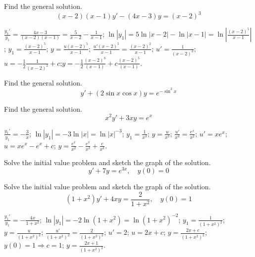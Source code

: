 \documentclass{ximera}
\begin{document}
\begin{problem}\label{exer:2.1.22} Find the general solution.
$$(x-2)(x-1)y'-(4x-3)y=(x-2)^3$$



\begin{solution}
    $\frac{y_1'}{ y_1}=\frac{4x-3}{(x-2)(x-1)}=\frac{5}{
x-2}-\frac{1}{ x-1}$;\quad
$\ln|y_1|=5\ln|x-2|-\ln|x-1|=\ln\left|\frac{(x-2)^5}{
x-1}\right|$;\quad
$y_1=\frac{(x-2)^5}{ x-1}$;\quad
 $y=\frac{u(x-2)^5}{ x-1}$;\quad
$\frac{u'(x-2)^5}{ x-1}=\frac{(x-2)^2}{ x-1}$;\quad
$u'=\frac{1}{ (x-2)^3}$;\quad
$u=-\frac{1}{ 2}\frac{1}{(x-2)^2} +c$;\quad $y=-\frac{1}{
2}\frac{(x-2)^3}{ (x-1)}+c\frac{(x-2)^5}{ (x-1)}$.
\end{solution}
\end{problem}

\begin{problem}\label{exer:2.1.23} Find the general solution.
$$y'+(2\sin x\cos x) y=e^{-\sin^2x}$$
\end{problem}

\begin{problem}\label{exer:2.1.24} Find the general solution.
$$x^2y'+3xy=e^x$$



\begin{solution}
    $\frac{y_1'}{ y_1}=-\frac{3}{ x}$;\quad
$\ln|y_1|=-3\ln|x|=\ln|x|^{-3}$;\quad
$y_1=\frac{1}{ x^3}$;\quad
$y=\frac{u}{ x^3}$;\quad
$\frac{u'}{ x^3}=\frac{e^x}{ x^2}$;\quad
$u'=xe^x$;\quad
$u=xe^x-e^x+c$;\quad
$y=\frac{e^x}{ x^2}-\frac{e^x}{ x^3}+\frac{c}{ x^3}$.
\end{solution}
\end{problem}

\begin{problem}\label{exer:2.1.25} Solve the
initial value problem and sketch the graph of the solution.
$$y'+7y=e^{3x},\quad y(0)=0$$
\end{problem}

\begin{problem}\label{exer:2.1.26} Solve the
initial value problem and sketch the graph of the solution.
$$(1+x^2)y'+4xy=\frac{2}{1+x^2},\quad y(0)=1$$



\begin{solution}
    $\frac{y_1'}{y_1}=-\frac{4x}{1+x^2}$;\quad
$\ln|y_1|=-2\ln(1+x^2)=\ln(1+x^2)^{-2}$;\quad
$y_1=\frac{1}{(1+x^2)^2}$;\quad
$y=\frac{u}{(1+x^2)^2}$;\quad
$\frac{u'}{(1+x^2)^2}=\frac{2}{(1+x^2)^2}$;\quad
$u'=2$;\quad
$u=2x+c$;\quad
$y=\frac{2x+c}{(1+x^2)^2}$;\quad
$y(0)=1\Rightarrow c=1$;\quad
$y=\frac{2x+1}{(1+x^2)^2}$.
\end{solution}
\end{problem}
\end{document}
